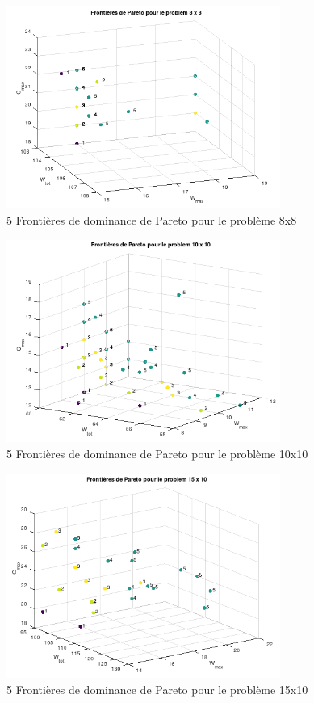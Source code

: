 \documentclass[10pt,a4paper]{scrartcl}
\begin{document}
\begin{figure}[!h]
  \centering
  \includegraphics[width=0.8\textwidth]{img/results8x8_Pareto.png}
  \caption{5 Frontières de dominance de Pareto pour le problème 8x8}
\end{figure}
\begin{figure}
  \centering
  \includegraphics[width=0.8\textwidth]{img/results10x10_Pareto.png}
  \caption{5 Frontières de dominance de Pareto pour le problème 10x10}
\end{figure}
\begin{figure}
  \centering
  \includegraphics[width=0.8\textwidth]{img/results15x10_Pareto.png}
  \caption{5 Frontières de dominance de Pareto pour le problème 15x10}
\end{figure}
\end{document}
